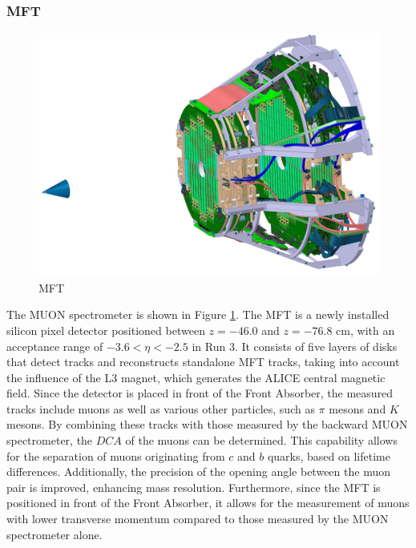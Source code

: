         \subsubsection{MFT}
            \begin{figure}[htbp]
                \centering
                \includegraphics[keepaspectratio, scale=0.17]{fig/2_3_MFT.jpg}
                \caption{MFT}
                \label{MFT}
            \end{figure}
            The MUON spectrometer is shown in Figure \ref{MFT}\cite{MFT_TDR}. The MFT is a newly installed silicon pixel detector positioned between $z = -46.0$ and $z = -76.8$ cm, with an acceptance range of $-3.6 < \eta < -2.5$ in Run 3. It consists of five layers of disks that detect tracks and reconstructs standalone MFT tracks, taking into account the influence of the L3 magnet, which generates the ALICE central magnetic field. Since the detector is placed in front of the Front Absorber, the measured tracks include muons as well as various other particles, such as $\pi$ mesons and $K$ mesons. By combining these tracks with those measured by the backward MUON spectrometer, the $DCA$ of the muons can be determined. This capability allows for the separation of muons originating from $c$ and $b$ quarks, based on lifetime differences. Additionally, the precision of the opening angle between the muon pair is improved, enhancing mass resolution. Furthermore, since the MFT is positioned in front of the Front Absorber, it allows for the measurement of muons with lower transverse momentum compared to those measured by the MUON spectrometer alone.

